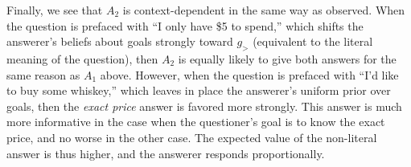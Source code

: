 \documentclass[11pt, floatsintext]{apa6}
\begin{document}
Finally, we see that $A_2$ is context-dependent in the same way as  observed. When the question is prefaced with ``I only have \$5 to spend,'' which shifts the answerer's beliefs about goals strongly toward $g_>$ (equivalent to the literal meaning of the question), then $A_2$ is equally likely to give both answers for the same reason as $A_1$ above. However, when the question is prefaced with ``I'd like to buy some whiskey,'' which leaves in place the answerer's uniform prior over goals, then the \emph{exact price} answer is favored more strongly. This answer is much more informative in the case when the questioner's goal is to know the exact price, and no worse in the other case. The expected value of the non-literal answer is thus higher, and the answerer responds proportionally. 


\end{document}
